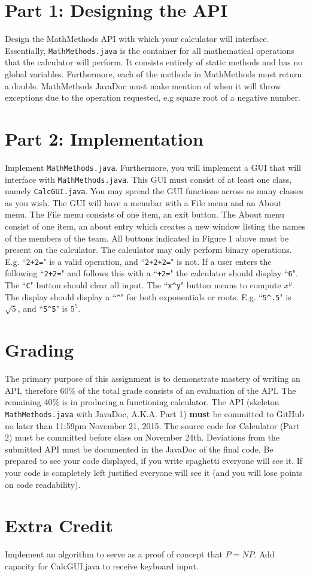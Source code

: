 \documentclass[]{simple}
\begin{document}
\section{Part 1: Designing the API}
Design the MathMethods API with which your calculator will interface.
Essentially, \verb|MathMethods.java| is the container for all mathematical operations that the calculator will perform.
It consists entirely of static methods and has no global variables.
Furthermore, each of the methods in MathMethods must return a double.
MathMethods JavaDoc must make mention of when it will throw exceptions due to the operation requested, e.g square root of a negative number.

\section{Part 2: Implementation}
Implement \verb|MathMethods.java|.
Furthermore, you will implement a GUI that will interface with \verb|MathMethods.java|.
This GUI must consist of at least one class, namely \verb|CalcGUI.java|.
You may spread the GUI functions across as many classes as you wish.
The GUI will have a menubar with a File menu and an About menu.
The File menu consists of one item, an exit button.
The About menu consist of one item, an about entry which creates a new window listing the names of the members of the team.
All buttons indicated in Figure 1 above must be present on the calculator.
The calculator may only perform binary operations. 
E.g. ``\verb|2+2=|" is a valid operation, and ``\verb|2+2+2=|" is not.
If a user enters the following ``\verb|2+2=|" and follows this with a ``\verb|+2=|" the calculator should display ``\verb|6|".
The ``\verb|C|" button should clear all input.
The ``\verb|x^y|" button means to compute $x^y$.
The display should display a ``\verb|^|" for both exponentials or roots.
E.g. ``\verb|5^.5|" is $\sqrt{5}$, and ``\verb|5^5|" is $5^{5}$.

\section {Grading}
The primary purpose of this assignment is to demonstrate mastery of writing an API, therefore 60\% of the total grade consists of an evaluation of the API.
The remaining 40\% is in producing a functioning calculator.
The API (skeleton \verb|MathMethods.java| with JavaDoc, A.K.A. Part 1) \textbf{must} be committed to GitHub no later than 11:59pm November 21, 2015.
The source code for Calculator (Part 2) must be committed before class on November 24th.
Deviations from the submitted API must be documented in the JavaDoc of the final code.
Be prepared to see your code displayed, if you write spaghetti everyone will see it.
If your code is completely left justified everyone will see it (and you will lose points on code readability).

\section{Extra Credit}
Implement an algorithm to serve as a proof of concept that $P=NP$.
Add capacity for CalcGUI.java to receive keyboard input.
\end{document}
